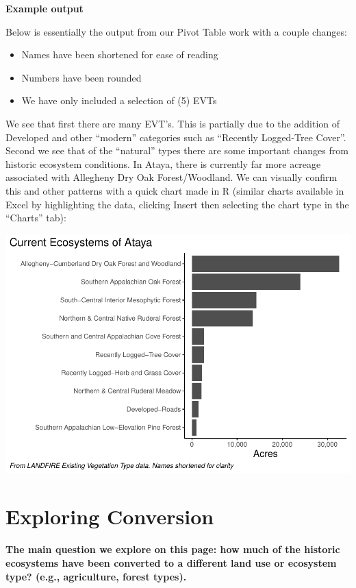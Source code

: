 \documentclass[
]{book}
\providecommand{\tightlist}{%
  \setlength{\itemsep}{0pt}\setlength{\parskip}{0pt}}
\begin{document}
\textbf{Example output}

Below is essentially the output from our Pivot Table work with a couple changes:

\begin{itemize}
\tightlist
\item
  Names have been shortened for ease of reading
\item
  Numbers have been rounded
\item
  We have only included a selection of (5) EVTs
\end{itemize}

We see that first there are many EVT's. This is partially due to the addition of Developed and other ``modern'' categories such as ``Recently Logged-Tree Cover''. Second we see that of the ``natural'' types there are some important changes from historic ecosystem conditions. In Ataya, there is currently far more acreage associated with Allegheny Dry Oak Forest/Woodland. We can visually confirm this and other patterns with a quick chart made in R (similar charts available in Excel by highlighting the data, clicking Insert then selecting the chart type in the ``Charts'' tab):

\includegraphics{FSCBook_files/figure-latex/evtChart-1.pdf}

\hypertarget{conversion}{%
\chapter{Exploring Conversion}\label{conversion}}

\textbf{The main question we explore on this page: how much of the historic ecosystems have been converted to a different land use or ecosystem type? (e.g., agriculture, forest types).}
\end{document}
